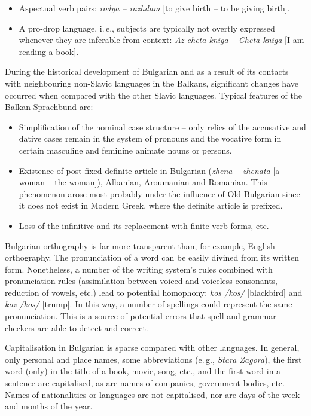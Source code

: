 \documentclass[]{../../metanetpaper}
\begin{document}
\begin{multicols}{2}
\begin{itemize}
\item Aspectual verb pairs: \textit{{rodya -- razhdam}} [to give birth – to be giving birth].

\item A pro-drop language, i.\,e., subjects are typically not overtly expressed whenever they are inferable from context: \textit{{Az cheta kniga -- Cheta kniga}} [I am reading a book]. 
\end{itemize}

During the historical development of Bulgarian and as a result of its contacts with neighbouring non-Slavic languages in the Balkans, significant changes have occurred when compared with the other Slavic languages. Typical features of the Balkan Sprachbund are:

\begin{itemize}
\item Simplification of the nominal case structure -- only relics of the accusative and dative cases remain in the system of pronouns and the vocative form in certain masculine and feminine animate nouns or persons.

\item Existence of post-fixed definite article in Bulgarian (\textit{{zhena -- zhenata}} [a woman -- the woman]), Albanian, Aroumanian and Romanian. This phenomenon arose most probably under the influence of Old Bulgarian since it does not exist in Modern Greek, where the definite article is prefixed.

\item Loss of the infinitive and its replacement with finite verb forms, etc. 
\end{itemize}

Bulgarian orthography is far more transparent than, for example, English orthography. The pronunciation of a word can be easily divined from its written form. Nonetheless, a number of the writing system's rules combined with pronunciation rules (assimilation between voiced and voiceless consonants, reduction of vowels, etc.) lead to potential homophony: \textit{{kos} /kos/} [blackbird] and \textit{{koz /kos/}} [trump]. In this way, a number of spellings could represent the same pronunciation. This is a source of potential errors that spell and grammar checkers are able to detect and correct.

Capitalisation in Bulgarian is sparse compared with other languages. In general, only personal and place names, some abbreviations (e.\,g., \textit{Stara Zagora}), the first word (only) in the title of a book, movie, song, etc., and the first word in a sentence are capitalised, as are names of companies, government bodies, etc. Names of nationalities or languages are not capitalised, nor are days of the week and months of the year.
 

\end{multicols}
\end{document}
